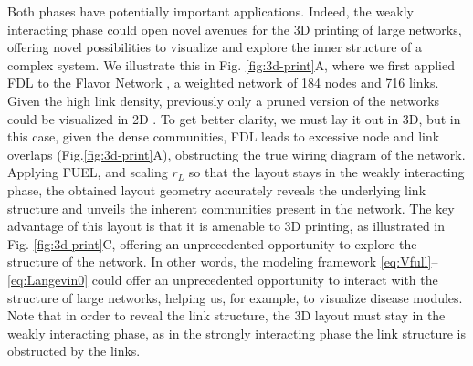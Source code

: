 \documentclass[nofootinbib,preprint,floatfix,titlepage,endfloats,superscriptaddress]{revtex4} %
\begin{document}
Both phases have potentially important applications. 
Indeed, the weakly interacting phase could open novel avenues for the 3D printing of large networks, offering novel possibilities to visualize and explore the inner structure of a complex system. 
We illustrate this in Fig. \ref{fig:3d-print}A, where we first applied FDL to the Flavor Network \cite{ahn2011flavor}, a weighted network of 184 nodes and 716 links.
Given the high link density, previously only a pruned version of the networks could be visualized in 2D \cite{ahn2011flavor}. 
To get better clarity, we must lay it out in 3D, but in this case, given the dense communities, FDL leads to excessive node and link overlaps (Fig.\ref{fig:3d-print}A), obstructing the true wiring diagram of the network. 
Applying FUEL, and scaling $r_L$ so that the layout stays in the weakly interacting phase, the obtained layout geometry accurately reveals the underlying link structure and unveils the inherent communities present in the network. 
The key advantage of this layout is that it is amenable to 3D printing, as illustrated in Fig. \ref{fig:3d-print}C, offering an unprecedented opportunity to explore the structure of the network.
In other words, the modeling framework \eqref{eq:Vfull}--\eqref{eq:Langevin0} could offer an unprecedented opportunity to interact with the structure of large networks, helping us, for example, to %
visualize disease modules.  
Note that in order to reveal the link structure, the 3D layout must stay in the weakly interacting phase, as in the strongly interacting phase the link structure is obstructed by the links.
\end{document}
